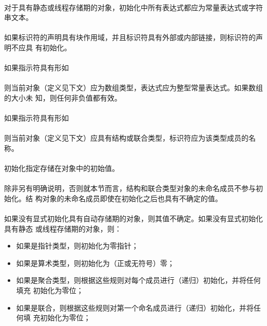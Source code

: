 {\paragraph{}
对于具有静态或线程存储期的对象，初始化中所有表达式都应为常量表达式或字符串文本。

\paragraph{}
如果标识符的声明具有块作用域，并且标识符具有外部或内部链接，则标识符的声明不应具
有初始化。

\paragraph{}
如果指示符具有形如                                                            \\
\mbox{\hspace{4em}\tm{[}  \tm{]}}                     \\
则当前对象（定义见下文）应为数组类型，表达式应为整型常量表达式。如果数组的大小未
知，则任何非负值都有效。

\paragraph{}
如果指示符具有形如                                                            \\
\mbox{\hspace{4em} }                                     \\
则当前对象（定义见下文）应具有结构或联合类型，标识符应为该类型成员的名称。

\semantic
\paragraph{}
初始化指定存储在对象中的初始值。

\paragraph{}
除非另有明确说明，否则就本节而言，结构和联合类型对象的未命名成员不参与初始化。结
构对象的未命名成员即使在初始化之后也具有不确定的值。

\paragraph{}
如果没有显式初始化具有自动存储期的对象，则其值不确定。如果没有显式初始化具有静态
或线程存储期的对象，则：
\begin{itemize}
  \item{如果是指针类型，则初始化为零指针；}
  \item{如果是算术类型，则初始化为（正或无符号）零；}
  \item{如果是聚合类型，则根据这些规则对每个成员进行（递归）初始化，并将任何填充
    初始化为零位；}
  \item{如果是联合，则根据这些规则对第一个命名成员进行（递归）初始化，并将任何填
    充初始化为零位；}
\end{itemize}

}
